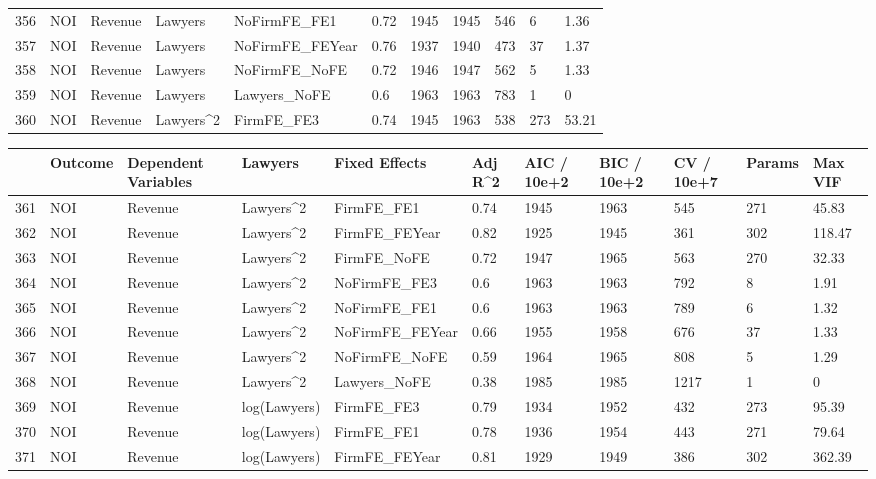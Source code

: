 \documentclass{article}
\begin{document}
\begin{table}[H]
\begin{tabular}{rllllllllll}
  356 & NOI & Revenue & Lawyers & NoFirmFE\_FE1 & 0.72 & 1945 & 1945 & 546 & 6 & 1.36 \\ 
  357 & NOI & Revenue & Lawyers & NoFirmFE\_FEYear & 0.76 & 1937 & 1940 & 473 & 37 & 1.37 \\ 
  358 & NOI & Revenue & Lawyers & NoFirmFE\_NoFE & 0.72 & 1946 & 1947 & 562 & 5 & 1.33 \\ 
  359 & NOI & Revenue & Lawyers & Lawyers\_NoFE & 0.6 & 1963 & 1963 & 783 & 1 & 0 \\ 
  360 & NOI & Revenue & Lawyers^2 & FirmFE\_FE3 & 0.74 & 1945 & 1963 & 538 & 273 & 53.21 \\ 
   \hline
\end{tabular}
\end{table}
\begin{table}[H]
\centering
\begin{tabular}{rllllllllll}
  \hline
 & Outcome & Dependent Variables & Lawyers & Fixed Effects & Adj R^2 & AIC / 10e+2 & BIC / 10e+2 & CV / 10e+7 & Params & Max VIF \\ 
  \hline
361 & NOI & Revenue & Lawyers^2 & FirmFE\_FE1 & 0.74 & 1945 & 1963 & 545 & 271 & 45.83 \\ 
  362 & NOI & Revenue & Lawyers^2 & FirmFE\_FEYear & 0.82 & 1925 & 1945 & 361 & 302 & 118.47 \\ 
  363 & NOI & Revenue & Lawyers^2 & FirmFE\_NoFE & 0.72 & 1947 & 1965 & 563 & 270 & 32.33 \\ 
  364 & NOI & Revenue & Lawyers^2 & NoFirmFE\_FE3 & 0.6 & 1963 & 1963 & 792 & 8 & 1.91 \\ 
  365 & NOI & Revenue & Lawyers^2 & NoFirmFE\_FE1 & 0.6 & 1963 & 1963 & 789 & 6 & 1.32 \\ 
  366 & NOI & Revenue & Lawyers^2 & NoFirmFE\_FEYear & 0.66 & 1955 & 1958 & 676 & 37 & 1.33 \\ 
  367 & NOI & Revenue & Lawyers^2 & NoFirmFE\_NoFE & 0.59 & 1964 & 1965 & 808 & 5 & 1.29 \\ 
  368 & NOI & Revenue & Lawyers^2 & Lawyers\_NoFE & 0.38 & 1985 & 1985 & 1217 & 1 & 0 \\ 
  369 & NOI & Revenue & log(Lawyers) & FirmFE\_FE3 & 0.79 & 1934 & 1952 & 432 & 273 & 95.39 \\ 
  370 & NOI & Revenue & log(Lawyers) & FirmFE\_FE1 & 0.78 & 1936 & 1954 & 443 & 271 & 79.64 \\ 
  371 & NOI & Revenue & log(Lawyers) & FirmFE\_FEYear & 0.81 & 1929 & 1949 & 386 & 302 & 362.39 \\ 

\end{tabular}
\end{table}
\end{document}
